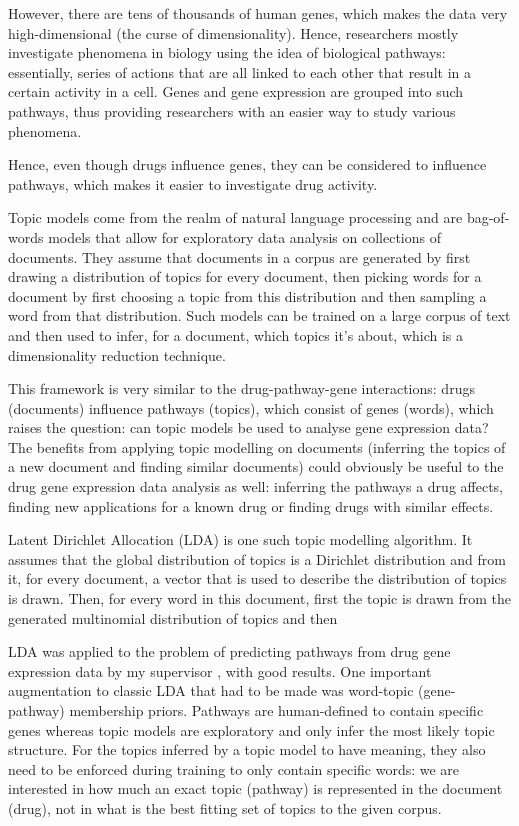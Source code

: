 \documentclass[12pt,a4paper,twoside,openright]{report}
\begin{document}
However, there are tens of thousands of human genes, which makes the data very high-dimensional (the curse of dimensionality). Hence, researchers mostly investigate phenomena in biology using the idea of biological pathways: essentially, series of actions that are all linked to each other that result in a certain activity in a cell. Genes and gene expression are grouped into such pathways, thus providing researchers with an easier way to study various phenomena.

Hence, even though drugs influence genes, they can be considered to influence pathways, which makes it easier to investigate drug activity.

Topic models come from the realm of natural language processing and are bag-of-words models that allow for exploratory data analysis on collections of documents. They assume that documents in a corpus are generated by first drawing a distribution of topics for every document, then picking words for a document by first choosing a topic from this distribution and then sampling a word from that distribution. Such models can be trained on a large corpus of text and then used to infer, for a document, which topics it's about, which is a dimensionality reduction technique.

This framework is very similar to the drug-pathway-gene interactions: drugs (documents) influence pathways (topics), which consist of genes (words), which raises the question: can topic models be used to analyse gene expression data? The benefits from applying topic modelling on documents (inferring the topics of a new document and finding similar documents) could obviously be useful to the drug gene expression data analysis as well: inferring the pathways a drug affects, finding new applications for a known drug or finding drugs with similar effects.

Latent Dirichlet Allocation (LDA) \cite{Blei} is one such topic modelling algorithm. It assumes that the global distribution of topics is a Dirichlet distribution and from it, for every document, a vector that is used to describe the distribution of topics is drawn. Then, for every word in this document, first the topic is drawn from the generated multinomial distribution of topics and then 

LDA was applied to the problem of predicting pathways from drug gene expression data by my supervisor \cite{Pratanwanich2014}, with good results. One important augmentation to classic LDA that had to be made was word-topic (gene-pathway) membership priors. Pathways are human-defined to contain specific genes whereas topic models are exploratory and only infer the most likely topic structure. For the topics inferred by a topic model to have meaning, they also need to be enforced during training to only contain specific words: we are interested in how much an exact topic (pathway) is represented in the document (drug), not in what is the best fitting set of topics to the given corpus.
\end{document}
